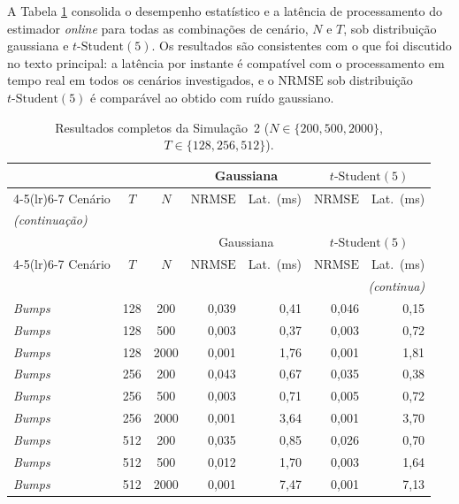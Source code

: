A Tabela \ref{tab:resultados_sim2} consolida o desempenho estatístico e a latência de processamento do estimador \emph{online} para todas as combinações de cenário, \(N\) e \(T\), sob distribuição gaussiana e \(t\text{-Student}(5)\). 
Os resultados são consistentes com o que foi discutido no texto principal: a latência por instante é compatível com o processamento em tempo real em todos os cenários investigados, e o \(\mathrm{NRMSE}\) sob distribuição \(t\text{-Student}(5)\) é comparável ao obtido com ruído gaussiano.

{\scriptsize
\begin{longtable}{@{}lccrrrr@{}}
\caption{Resultados completos da Simulação~2 (\(N \in \{200, 500, 2000\}\), \(T \in \{128, 256, 512\}\)).}\label{tab:resultados_sim2} \\
\toprule
 & & & \multicolumn{2}{c}{Gaussiana} & \multicolumn{2}{c}{\(t\text{-Student}(5)\)} \\
\cmidrule(lr){4-5}\cmidrule(lr){6-7}
Cenário & \(T\) & \(N\) & \(\mathrm{NRMSE}\) & Lat.\ (ms) & \(\mathrm{NRMSE}\) & Lat.\ (ms) \\
\midrule
\endfirsthead
\multicolumn{7}{l}{\itshape (continuação)} \\
\toprule
 & & & \multicolumn{2}{c}{Gaussiana} & \multicolumn{2}{c}{\(t\text{-Student}(5)\)} \\
\cmidrule(lr){4-5}\cmidrule(lr){6-7}
Cenário & \(T\) & \(N\) & \(\mathrm{NRMSE}\) & Lat.\ (ms) & \(\mathrm{NRMSE}\) & Lat.\ (ms) \\
\midrule
\endhead
\midrule \multicolumn{7}{r}{\itshape (continua)} \\
\endfoot
\bottomrule
\endlastfoot
\emph{Bumps} & 128 & 200 & 0{,}039 & 0{,}41 & 0{,}046 & 0{,}15 \\
\emph{Bumps} & 128 & 500 & 0{,}003 & 0{,}37 & 0{,}003 & 0{,}72 \\
\emph{Bumps} & 128 & 2000 & 0{,}001 & 1{,}76 & 0{,}001 & 1{,}81 \\
\emph{Bumps} & 256 & 200 & 0{,}043 & 0{,}67 & 0{,}035 & 0{,}38 \\
\emph{Bumps} & 256 & 500 & 0{,}003 & 0{,}71 & 0{,}005 & 0{,}72 \\
\emph{Bumps} & 256 & 2000 & 0{,}001 & 3{,}64 & 0{,}001 & 3{,}70 \\
\emph{Bumps} & 512 & 200 & 0{,}035 & 0{,}85 & 0{,}026 & 0{,}70 \\
\emph{Bumps} & 512 & 500 & 0{,}012 & 1{,}70 & 0{,}003 & 1{,}64 \\
\emph{Bumps} & 512 & 2000 & 0{,}001 & 7{,}47 & 0{,}001 & 7{,}13 \\

\end{longtable}}
